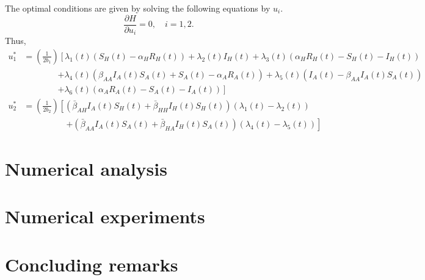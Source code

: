 \documentclass[11pt]{amsart}
\theoremstyle{definition}
\numberwithin{equation}{section}
\begin{document}
    The optimal conditions are given by solving the following equations by $u_{i}$. 
    \begin{equation*}
        \frac{\partial H}{\partial u_{i}} = 0,\quad i=1,2.
    \end{equation*}
    Thus,
    \begin{equation*}
        \begin{aligned}
        u_{1}^{*} &= \left(\frac{1}{2b_{1}}\right)
        \left[ 
            \lambda_{1}(t)
            \left(
            S_{H}(t) - \alpha_{H} R_{H}(t)
            \right)    
            + 
            \lambda_{2}(t) I_{H}(t)
            + 
            \lambda_{3}(t)
            \left(
            \alpha_{H} R_{H}(t) - S_{H}(t) - I_{H}(t)
            \right)
            \right.\\
            &\quad\quad\quad\quad \left.
            + 
            \lambda_{4}(t)
            \left(
                \beta_{AA} I_{A}(t) S_{A}(t) + S_{A}(t) - \alpha_{A}R_{A}(t)
            \right)
            + 
            \lambda_{5}(t)
            \left(
                I_{A}(t) - \beta_{AA} I_{A}(t) S_{A}(t)
            \right)
            \right.\\
            &\quad\quad\quad\quad \left.            
            +
            \lambda_{6}(t)
            \left(
                \alpha_{A} R_{A}(t) - S_{A}(t) - I_{A}(t)
            \right)
        \right]\\[0.2cm]
        u_{2}^{*} &= \left(\frac{1}{2b_{2}}\right)
        \left[
            \left(
                \bar{\beta}_{AH} I_{A}(t) S_{H}(t)
                + 
                \bar{\beta}_{HH} I_{H}(t) S_{H}(t)
            \right)
            \left(
                \lambda_{1}(t) - \lambda_{2}(t)
            \right)
            \right.\\
            &\quad\quad\quad\quad\quad \left.            
            +
            \left(
                \bar{\beta}_{AA} I_{A}(t) S_{A}(t)
                +
                \bar{\beta}_{HA} I_{H}(t) S_{A}(t)
            \right)
            \left(
                \lambda_{4}(t) - \lambda_{5}(t)
            \right)
        \right]
        \end{aligned}
    \end{equation*}
    \section{Numerical analysis}
    \section{Numerical experiments}
    \section{Concluding remarks}
%
%  
%  
\end{document}
